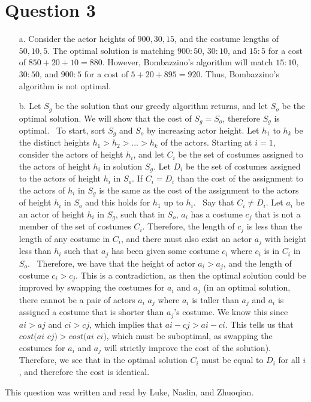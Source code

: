 \documentclass[12pt]{article}
\begin{document}
\section*{Question 3} 
\begin{enumerate}
    \item[a.] Consider the actor heights of $900, 30, 15$, and the costume lengths of $50, 10, 5$. The optimal solution is matching $900 : 50$, $30 : 10$, and $15 : 5$ for a cost of $850 + 20 + 10 = 880$. However, Bombazzino's algorithm will match $15 : 10$, $30 : 50$, and $900 : 5$ for a cost of $5 + 20 + 895 = 920$. Thus, Bombazzino's algorithm is not optimal.
    \item[b.] Let $S_g$ be the solution that our greedy algorithm returns, and let $S_o$ be the optimal solution. We will show that the cost of $S_g = S_o$, therefore $S_g$ is optimal.
    \newline \,
    \newline
    To start, sort $S_g$ and $S_o$ by increasing actor height. Let $h_1$ to $h_k$ be the distinct heights $h_1 > h_2 > ... > h_k$ of the actors. Starting at $i = 1$, consider the actors of height $h_i$, and let $C_i$ be the set of costumes assigned to the actors of height $h_i$ in solution $S_g$. Let $D_i$ be the set of costumes assigned to the actors of height $h_i$ in $S_o$. If $C_i = D_i$ than the cost of the assignment to the actors of $h_i$ in $S_g$ is the same as the cost of the assignment to the actors of height $h_i$ in $S_o$ and this holds for $h_1$ up to $h_i$.
    \newline \,
    \newline
    Say that $C_i \neq D_i$. Let $a_i$ be an actor of height $h_i$ in $S_g$, such that in $S_o$, $a_i$ has a costume $c_j$ that is not a member of the set of costumes $C_i$. Therefore, the length of $c_j$ is less than the length of any costume in $C_i$, and there must also exist an actor $a_j$ with height less than $h_i$ such that $a_j$ has been given some costume $c_i$ where $c_i$ is in $C_i$ in $S_o$.
    \newline \,
    \newline
    Therefore, we have that the height of actor $a_i > a_j$, and the length of costume $c_i > c_j$. This is a contradiction, as then the optimal solution could be improved by swapping the costumes for $a_i$ and $a_j$ 
    (in an optimal solution, there cannot be a pair of actors $a_i$ $a_j$ where $a_i$ is taller than $a_j$ and $a_i$ is assigned a costume that is shorter than $a_j$'s costume. We know this since $ai > aj$ and $ci > cj$, which implies that $ai - cj > ai - ci$. This tells us that $cost(ai$ $cj) > cost(ai$ $ci)$, which must be suboptimal, as swapping the costumes for $a_i$ and $a_j$ will strictly improve the cost of the solution). Therefore, we see that in the optimal solution $C_i$ must be equal to $D_i$ for all $i$, and therefore the cost is identical.

\end{enumerate}

This question was written and read by  Luke, Naslin, and Zhuoqian.
\end{document}
